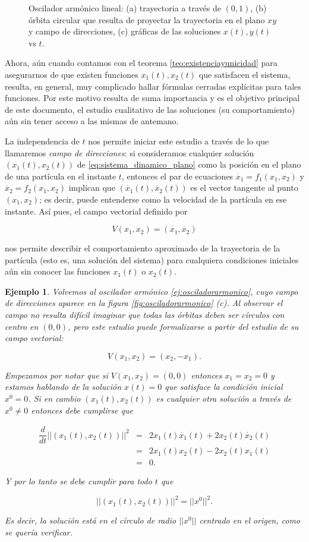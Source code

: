 \documentclass[11pt]{book}
\theoremstyle{definition}
\numberwithin{definition}{section}
\theoremstyle{theorem}
\numberwithin{theorem}{section}
\numberwithin{lemma}{section}
\numberwithin{corollary}{section}
\theoremstyle{plain}
\newtheorem{example}{Ejemplo}
\numberwithin{example}{section}
\begin{document}
\begin{figure}
    \caption{Oscilador armónico lineal: (a) trayectoria a través de $(0,1)$, (b) órbita circular que resulta de proyectar la trayectoria en el plano $xy$ y campo de direcciones, (c) gráficas de las soluciones $x(t), y(t)$ vs $t$.}
\end{figure}

Ahora, aún cuando contamos con el teorema \ref{teo:existenciayunicidad} para asegurarnos de que existen funciones $x_1(t), x_2(t)$ que satisfacen el sistema, resulta, en general, muy complicado hallar fórmulas cerradas explícitas para tales funciones. Por este motivo resulta de suma importancia y es el objetivo principal de este documento, el estudio cualitativo de las soluciones (su comportamiento) aún sin tener acceso a las mismas de antemano.

La independencia de $t$ nos permite iniciar este estudio a través de lo que llamaremos \emph{campo de direcciones}: si consideramos cualquier solución $(x_1(t),x_2(t))$ de \ref{eq:sistema_dinamico_plano} como la posición en el plano de una partícula en el instante $t$, entonces el par de ecuaciones $\dot{x_1} = f_1(x_1,x_2)$ y $\dot{x_2} = f_2(x_1,x_2)$ implican que $(\dot{x_1}(t),\dot{x_2}(t))$ es el vector tangente al punto $(x_1,x_2)$; es decir, puede entenderse como la velocidad de la partícula en ese instante. Así pues, el campo vectorial definido por 

$$ V(x_1,x_2) = (\dot{x_1}, \dot{x_2})$$

nos permite describir el comportamiento aproximado de la trayectoria de la partícula (esto es, una solución del sistema) para cualquiera condiciones iniciales aún sin conocer las funciones $x_1(t)$ o $x_2(t)$.

\begin{example} \label{ej:sistemahiperbolas}
Volvemos al oscilador armónico \ref{ej:osciladorarmonico}, cuyo campo de direcciones aparece en la figura \ref{fig:osciladorarmonico} (c).
Al observar el campo no resulta difícil imaginar que todas las órbitas deben ser círculos con centro en $(0,0)$, pero este estudio puede formalizarse a partir del estudio de su campo vectorial:

$$ V(x_1,x_2) = (x_2, -x_1). $$

Empezamos por notar que si $V(x_1,x_2) = (0,0)$ entonces $x_1 = x_2 = 0$ y estamos hablando de la solución $x(t) = 0$ que satisface la condición inicial $x^0 = 0$. Si en cambio $(x_1(t),x_2(t))$ es cualquier otra solución a través de $x^0 \neq 0$ entonces debe cumplirse que 

$$
\begin{array}{ccl}
	\dfrac{d}{dt} || (x_1(t),x_2(t))  ||^2 & = & 2x_1(t)\dot{x_1}(t) + 2x_2(t)\dot{x_2}(t) \\
									   & = & 2x_1(t)x_2(t) - 2x_2(t)x_1(t) \\
									   & = & 0.
\end{array}
$$

Y por lo tanto se debe cumplir para todo $t$ que

$$ ||(x_1(t), x_2(t))||^2 = ||x^0||^2. $$

Es decir, la solución está en el círculo de radio $||x^0||$ centrado en el origen, como se quería verificar.
\end{example}
\end{document}
